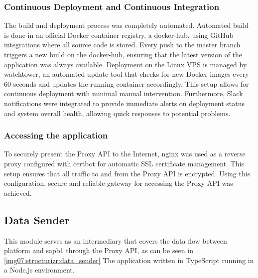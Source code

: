 \subsubsection{Continuous Deployment and Continuous Integration}
\label{subsubsec:cicd}
The build and deployment process was completely automated. 
Automated build is done in an official Docker container registry, a \gls{docker-hub}, using GitHub integrations where all source code is stored.
Every push to the master branch triggers a new build on the \gls{docker-hub}, ensuring that the latest version of the application was always available.
Deployment on the Linux VPS is managed by \gls{watchtower}, an automated update tool that checks for new Docker images every 60 seconds and updates the running container accordingly.
This setup allows for continuous deployment with minimal manual intervention.
Furthermore, Slack notifications were integrated to provide immediate alerts on deployment status and system overall health, allowing quick responses to potential problems.

\subsubsection{Accessing the application}
To securely present the Proxy API to the Internet, \gls{nginx} was used as a reverse proxy configured with \gls{certbot} for automatic SSL certificate management.
This setup ensures that all traffic to and from the Proxy API is encrypted.
Using this configuration, secure and reliable gateway for accessing the Proxy API was achieved.


\subsection{Data Sender}
\label{subsec:data-sender}

This module serves as an intermediary that covers the data flow between platform and \gls{sapb1} through the Proxy API, as can be seen in \ref{img07:structurizr:data_sender}
The application written in TypeScript running in a Node.js environment.

